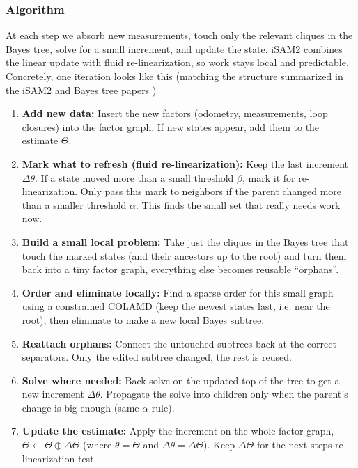 \subsubsection{Algorithm}
At each step we absorb new measurements, touch only the relevant cliques in the Bayes tree, solve for a small increment, and update the state. iSAM2 combines the linear update with fluid re-linearization, so work stays local and predictable. Concretely, one iteration looks like this (matching the structure summarized in the iSAM2 and Bayes tree papers \cite{iSAM2_paper,Bayes_tree_for_SLAM_paper})
\begin{enumerate}
    \item \textbf{Add new data:} Insert the new factors (odometry, measurements, loop closures) into the factor graph. If new states appear, add them to the estimate $\Theta$.

    \item \textbf{Mark what to refresh (fluid re-linearization):} Keep the last increment $\Delta\theta$. If a state moved more than a small threshold $\beta$, mark it for re-linearization. Only pass this mark to neighbors if the parent changed more than a smaller threshold $\alpha$. This finds the small set that really needs work now.

    \item \textbf{Build a small local problem:} Take just the cliques in the Bayes tree that touch the marked states (and their ancestors up to the root) and turn them back into a tiny factor graph, everything else becomes reusable ``orphans''.

    \item \textbf{Order and eliminate locally:} Find a sparse order for this small graph using a constrained COLAMD (keep the newest states last, i.e. near the root), then eliminate to make a new local Bayes subtree.

    \item \textbf{Reattach orphans:} Connect the untouched subtrees back at the correct separators. Only the edited subtree changed, the rest is reused.

    \item \textbf{Solve where needed:} Back solve on the updated top of the tree to get a new increment $\Delta\theta$. Propagate the solve into children only when the parent's change is big enough (same $\alpha$ rule).

    \item \textbf{Update the estimate:} Apply the increment on the whole factor graph, $\Theta \leftarrow \Theta \oplus \Delta\Theta$ (where $\theta = \Theta$ and $\Delta\theta = \Delta\Theta$). Keep $\Delta\Theta$ for the next steps re-linearization test.


\end{enumerate}
